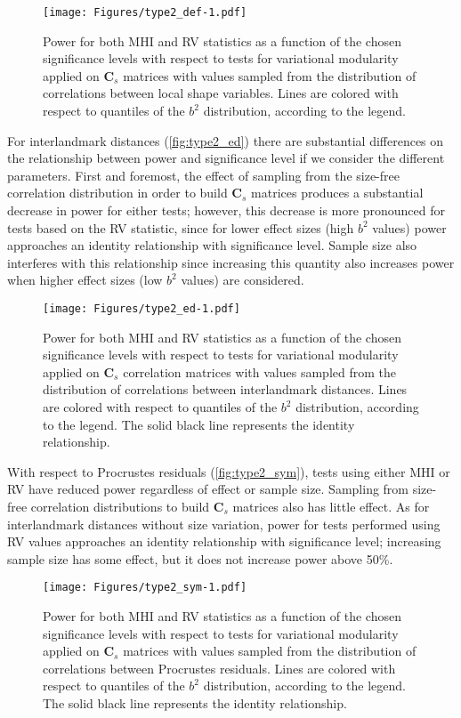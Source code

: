 \documentclass[12pt,]{article}
\begin{document}
\begin{figure}[htbp]
\centering
\texttt{[image: Figures/type2\_def-1.pdf]}
\caption{Power for both MHI and RV statistics as a function of the
chosen significance levels with respect to tests for variational
modularity applied on $\mathbf{C}_s$ matrices with values sampled from
the distribution of correlations between local shape variables. Lines
are colored with respect to quantiles of the $b^2$ distribution,
according to the legend. \label{fig:type2_def}}
\end{figure}

For interlandmark distances (\autoref{fig:type2_ed}) there are
substantial differences on the relationship between power and
significance level if we consider the different parameters. First and
foremost, the effect of sampling from the size-free correlation
distribution in order to build $\mathbf{C}_s$ matrices produces a
substantial decrease in power for either tests; however, this decrease
is more pronounced for tests based on the RV statistic, since for lower
effect sizes (high $b^2$ values) power approaches an identity
relationship with significance level. Sample size also interferes with
this relationship since increasing this quantity also increases power
when higher effect sizes (low $b^2$ values) are considered.

\begin{figure}[htbp]
\centering
\texttt{[image: Figures/type2\_ed-1.pdf]}
\caption{Power for both MHI and RV statistics as a function of the
chosen significance levels with respect to tests for variational
modularity applied on $\mathbf{C}_s$ correlation matrices with values
sampled from the distribution of correlations between interlandmark
distances. Lines are colored with respect to quantiles of the $b^2$
distribution, according to the legend. The solid black line represents
the identity relationship. \label{fig:type2_ed}}
\end{figure}

With respect to Procrustes residuals (\autoref{fig:type2_sym}), tests
using either MHI or RV have reduced power regardless of effect or sample
size. Sampling from size-free correlation distributions to build
$\mathbf{C}_s$ matrices also has little effect. As for interlandmark
distances without size variation, power for tests performed using RV
values approaches an identity relationship with significance level;
increasing sample size has some effect, but it does not increase power
above 50\%.

\begin{figure}[htbp]
\centering
\texttt{[image: Figures/type2\_sym-1.pdf]}
\caption{Power for both MHI and RV statistics as a function of the
chosen significance levels with respect to tests for variational
modularity applied on $\mathbf{C}_s$ matrices with values sampled from
the distribution of correlations between Procrustes residuals. Lines are
colored with respect to quantiles of the $b^2$ distribution, according
to the legend. The solid black line represents the identity
relationship. \label{fig:type2_sym}}
\end{figure}
\end{document}
